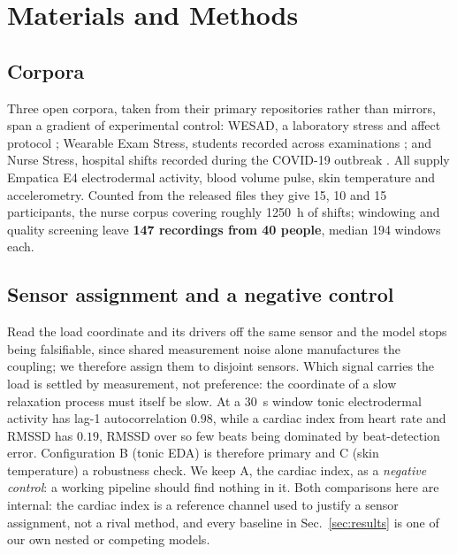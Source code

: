 \documentclass[conference]{IEEEtran}
\begin{document}
\section{Materials and Methods}
\label{sec:methods}

\subsection{Corpora}
Three open corpora, taken from their primary repositories rather than
mirrors, span a gradient of experimental control: WESAD, a laboratory stress
and affect protocol \cite{schmidt2018wesad}; Wearable Exam Stress, students
recorded across examinations \cite{amin2022exam}; and Nurse Stress, hospital
shifts recorded during the COVID-19 outbreak \cite{hosseini2022nurse}. All
supply Empatica E4 electrodermal activity, blood volume pulse, skin temperature
and accelerometry. Counted from the released files they give 15, 10 and 15
participants, the nurse corpus covering roughly \SI{1250}{\hour} of shifts;
windowing and quality screening leave \textbf{147 recordings from 40 people},
median 194 windows each.

\subsection{Sensor assignment and a negative control}
Read the load coordinate and its drivers off the same sensor and the model stops
being falsifiable, since shared measurement noise alone manufactures the
coupling; we therefore assign them to disjoint sensors. Which signal carries the
load is settled by measurement, not preference: the coordinate of a slow
relaxation process must itself be slow. At a \SI{30}{\second} window tonic
electrodermal activity has lag-1 autocorrelation $0.98$, while a cardiac index
from heart rate and RMSSD has $0.19$, RMSSD over so few beats being dominated by
beat-detection error. Configuration B (tonic EDA) is therefore primary and C
(skin temperature) a robustness check. We keep A, the cardiac index, as a
\emph{negative control}: a working pipeline should find nothing in it. Both comparisons here are internal: the cardiac index is a reference channel
used to justify a sensor assignment, not a rival method, and every baseline in
Sec.~\ref{sec:results} is one of our own nested or competing models.
\end{document}
